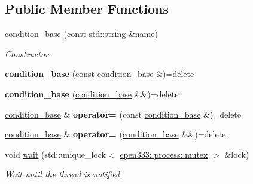 \subsection*{Public Member Functions}
\begin{DoxyCompactItemize}
\item 
\hyperlink{classcpen333_1_1process_1_1condition__base_a23384ba303cc2111cc4272830ae9f72b}{condition\+\_\+base} (const std\+::string \&name)
\begin{DoxyCompactList}\small\item\em Constructor. \end{DoxyCompactList}\item 
\mbox{\label{classcpen333_1_1process_1_1condition__base_a9e0b0c4673dbf0a671384e2cbb052eb5}} 
{\bfseries condition\+\_\+base} (const \hyperlink{classcpen333_1_1process_1_1condition__base}{condition\+\_\+base} \&)=delete
\item 
\mbox{\label{classcpen333_1_1process_1_1condition__base_a548a4d624fb76931bfecbdf94f5c0071}} 
{\bfseries condition\+\_\+base} (\hyperlink{classcpen333_1_1process_1_1condition__base}{condition\+\_\+base} \&\&)=delete
\item 
\mbox{\label{classcpen333_1_1process_1_1condition__base_a6db93cee4800ed14ed56e9029cdd0bd4}} 
\hyperlink{classcpen333_1_1process_1_1condition__base}{condition\+\_\+base} \& {\bfseries operator=} (const \hyperlink{classcpen333_1_1process_1_1condition__base}{condition\+\_\+base} \&)=delete
\item 
\mbox{\label{classcpen333_1_1process_1_1condition__base_a5cc13eb5e8317a05ed3130cdd8c1a4bf}} 
\hyperlink{classcpen333_1_1process_1_1condition__base}{condition\+\_\+base} \& {\bfseries operator=} (\hyperlink{classcpen333_1_1process_1_1condition__base}{condition\+\_\+base} \&\&)=delete
\item 
void \hyperlink{classcpen333_1_1process_1_1condition__base_a29b67e4579cef831f709ea4c3a32ffe5}{wait} (std\+::unique\+\_\+lock$<$ \hyperlink{classcpen333_1_1process_1_1mutex}{cpen333\+::process\+::mutex} $>$ \&lock)
\begin{DoxyCompactList}\small\item\em Wait until the thread is notified. \end{DoxyCompactList}\item 

\end{DoxyCompactItemize}
